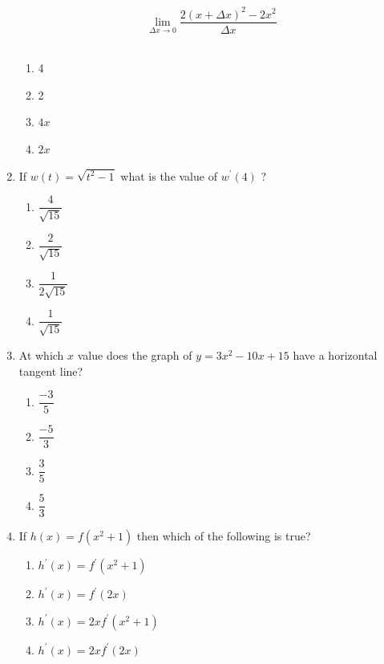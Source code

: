 \documentclass{article}
\begin{document}
\begin{enumerate}
\begin{minipage}[t]{\linewidth}
\[
\lim _{\Delta x \rightarrow 0} \frac{2(x+\Delta x)^{2}-2 x^{2}}{\Delta x}
\]\\[0.1em]
		\begin{enumerate}
		\itemsep1em
			\item  4
			\item  2
			\item  $4 x$
			\item  $2 x$
		\end{enumerate}
	\end{minipage}
	\item
	\begin{minipage}[t]{\linewidth}
		If \(w(t)=\sqrt{t^{2}-1}\) what is the value of \(w^{\prime}(4)\) ?\\[0.1em]
		\begin{enumerate}
		\itemsep1em
			\item  $\dfrac{4}{\sqrt{15}}$
			\item  $\dfrac{2}{\sqrt{15}}$
			\item  $\dfrac{1}{2 \sqrt{15}}$
			\item  $\dfrac{1}{\sqrt{15}}$
		\end{enumerate}
	\end{minipage}
	\item
	\begin{minipage}[t]{\linewidth}
		At which \(x\) value does the graph of \(y=3 x^{2}-10 x+15\) have a
horizontal tangent line?\\[0.1em]
		\begin{enumerate}
		\itemsep1em
			\item  $\dfrac{-3}{5}$
			\item  $\dfrac{-5}{3}$
			\item  $\dfrac{3}{5}$
			\item  $\dfrac{5}{3}$
		\end{enumerate}
	\end{minipage}
	\item
	\begin{minipage}[t]{\linewidth}
		If \(h(x)=f\left(x^{2}+1\right)\) then which of the following is true?\\[0.1em]
		\begin{enumerate}
		\itemsep1em
			\item  $h^{\prime}(x)=f^{\prime}\left(x^{2}+1\right)$
			\item  $h^{\prime}(x)=f^{\prime}(2 x)$
			\item  $h^{\prime}(x)=2x f^{\prime}\left(x^{2}+1\right)$
			\item  $h^{\prime}(x)=2 x f^{\prime}(2 x)$

\end{enumerate}
\end{minipage}
\end{enumerate}
\end{document}
